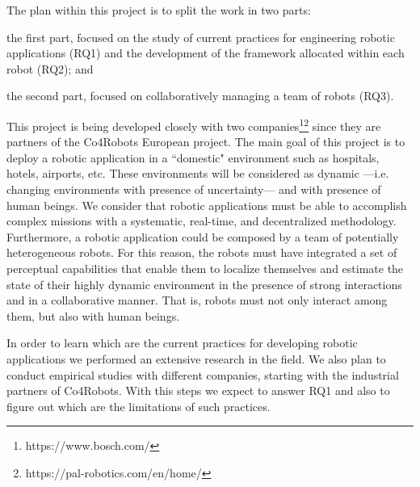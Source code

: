 The plan within this project is to split the work in two parts:
\begin{enumerate*}
\item the first part, focused on the study of current practices for engineering robotic applications (RQ1) and the development of the framework allocated within each robot (RQ2); and
\item the second part, focused on collaboratively managing a team of robots (RQ3).
\end{enumerate*}

This project is being developed closely with two companies\footnote{https://www.bosch.com/}\footnote{https://pal-robotics.com/en/home/} since they are partners of the Co4Robots European project.
The main goal of this project is to deploy a robotic application in a ``domestic" environment such as hospitals, hotels, airports, etc.
These environments will be considered as dynamic ---i.e. changing environments with presence of uncertainty--- and with presence of human beings.
We consider that robotic applications must be able to accomplish complex missions with a systematic, real-time, and decentralized methodology.
Furthermore, a robotic application could be composed by a team of potentially heterogeneous robots.
For this reason, the robots must have integrated a set of perceptual capabilities that enable them to localize themselves and estimate the state of their highly dynamic environment in the presence of strong interactions and in a collaborative manner.
That is, robots must not only interact among them, but also with human beings.

In order to learn which are the current practices for developing robotic applications we performed an extensive research in the field.
We also plan to conduct empirical studies with different companies, starting with the industrial partners of Co4Robots.
With this steps we expect to answer RQ1 and also to figure out which are the limitations of such practices.  




